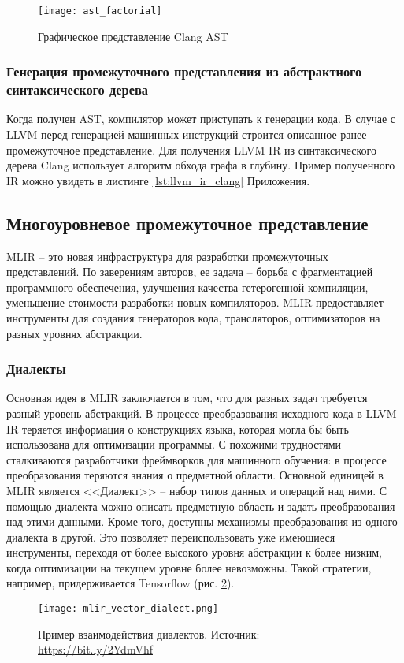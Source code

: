 \begin{figure}[h]
  \centering
  \texttt{[image: ast\_factorial]}
  \caption{Графическое представление Clang AST} 
  \label{fig:clang_ast}
\end{figure}


\subsubsection{Генерация промежуточного представления из абстрактного синтаксического дерева}
Когда получен AST, компилятор может приступать к генерации кода. В случае с LLVM
перед генерацией машинных инструкций строится описанное ранее промежуточное
представление. Для получения LLVM IR из синтаксического дерева Clang использует
алгоритм обхода графа в глубину. Пример полученного IR можно увидеть в листинге
\ref{lst:llvm_ir_clang} Приложения.

\subsection{Многоуровневое промежуточное представление}
MLIR -- это новая инфраструктура для разработки промежуточных представлений.
По заверениям авторов, ее задача -- борьба с фрагментацией программного
обеспечения, улучшения качества гетерогенной компиляции, уменьшение стоимости
разработки новых компиляторов. MLIR предоставляет инструменты для создания
генераторов кода, трансляторов, оптимизаторов на разных уровнях абстракции\cite{Lattner2020}.
\subsubsection{Диалекты}
Основная идея в MLIR заключается в том, что для разных задач требуется разный
уровень абстракций. В процессе преобразования исходного кода в LLVM IR теряется
информация о конструкциях языка, которая могла бы быть использована для
оптимизации программы. С похожими трудностями сталкиваются разработчики
фреймворков для машинного обучения: в процессе преобразования теряются знания
о предметной области. Основной единицей в MLIR является <<Диалект>> -- набор
типов данных и операций над ними. С помощью диалекта можно описать предметную
область и задать преобразования над этими данными. Кроме того, доступны
механизмы преобразования из одного диалекта в другой. Это позволяет
переиспользовать уже имеющиеся инструменты, переходя от более высокого уровня
абстракции к более низким, когда оптимизации на текущем уровне более невозможны.
Такой стратегии, например, придерживается Tensorflow (рис. \ref{fig:tf_dialects}).
\begin{figure}[h]
    \centering
    \texttt{[image: mlir\_vector\_dialect.png]}
    \caption{Пример взаимодействия диалектов. Источник: \url{https://bit.ly/2YdmVhf}
    }
    \label{fig:tf_dialects}
\end{figure}
